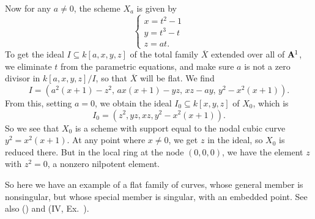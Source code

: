 {Now for any $a\ne0$, the scheme $X_a$ is given by
\[
\begin{cases}
x=t^2-1\\
y=t^3-t\\
z=at.
\end{cases}
\]
To get the ideal $I\subseteq k[a,x,y,z]$ of the total family $\overline X$ extended over all of $\AffSpace{1}$, we eliminate $t$ from the parametric equations, and make sure $a$ is not a zero divisor in $k[a,x,y,z]/I$, so that $\overline X$ will be flat. We find
\[
I=(a^2(x+1)-z^2,\,ax(x+1)-yz,\,xz-ay,\,y^2-x^2(x+1)).
\]
From this, setting $a=0$, we obtain the ideal $I_0\subseteq k[x,y,z]$ of $X_0$, which is
\[
I_0=(z^2,yz,xz,y^2-x^2(x+1)).
\]
So we see that $X_0$ is a scheme with support equal to the nodal cubic curve $y^2=x^2(x+1)$. At any point where $x\ne0$, we get $z$ in the ideal, so $X_0$ is reduced there. But in the local ring at the node $(0,0,0)$, we have the element $z$ with $z^2=0$, a nonzero nilpotent element.

So here we have an example of a flat family of curves, whose general member is nonsingular, but whose special member is singular, with an embedded point. See also () and (IV, Ex.~).}
